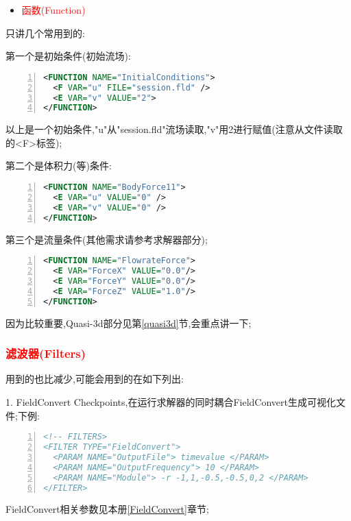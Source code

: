 \begin{itemize}
	\item{\textcolor{red}{函数(Function)}}
\end{itemize}
只讲几个常用到的:\par

第一个是初始条件(初始流场):\par
\begin{lstlisting}[frame=single,numbers=left,language=XML]
<FUNCTION NAME="InitialConditions">
  <F VAR="u" FILE="session.fld" />
  <E VAR="v" VALUE="2">
</FUNCTION>
\end{lstlisting}
\par
以上是一个初始条件,"u"从"session.fld"流场读取,"v"用2进行赋值(注意从文件读取的<F>标签);\par

第二个是体积力(等)条件:\par \label{bffunction}
\begin{lstlisting}[frame=single,numbers=left,language=XML]
<FUNCTION NAME="BodyForce11">
  <E VAR="u" VALUE="0" />
  <E VAR="v" VALUE="0" />
</FUNCTION>
\end{lstlisting}
\par


第三个是流量条件(其他需求请参考求解器部分);
\begin{lstlisting}[frame=single,numbers=left,language=XML]
<FUNCTION NAME="FlowrateForce">
  <E VAR="ForceX" VALUE="0.0"/>
  <E VAR="ForceY" VALUE="0.0"/>
  <E VAR="ForceZ" VALUE="1.0"/>
</FUNCTION>
\end{lstlisting}
\par

因为比较重要,Quasi-3d部分见第\ref{quasi3d}节,会重点讲一下;

\subsubsection{\textcolor{red}{滤波器(Filters)}} \label{xmlfilter}
用到的也比减少,可能会用到的在如下列出:\par

1. FieldConvert Checkpoints,在运行求解器的同时耦合FieldConvert生成可视化文件;下例:\par
\begin{lstlisting}[frame=single,numbers=left,language=XML]
<!-- FILTERS>
<FILTER TYPE="FieldConvert">
  <PARAM NAME="OutputFile"> timevalue </PARAM>
  <PARAM NAME="OutputFrequency"> 10 </PARAM>
  <PARAM NAME="Module"> -r -1,1,-0.5,-0.5,0,2 </PARAM>
</FILTER>
\end{lstlisting}
\par
FieldConvert相关参数见本册\ref{FieldConvert}章节;

